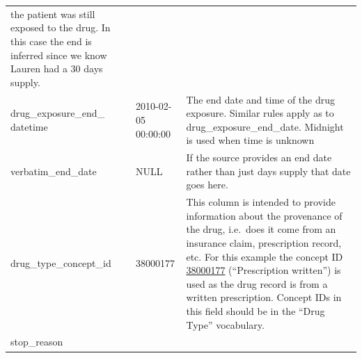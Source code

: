 \documentclass[11pt]{book}
\begin{document}
\begin{longtable}[]{@{}lll@{}}
\begin{minipage}[t]{0.48\columnwidth}
the patient was still exposed to the drug. In this case the end is
inferred since we know Lauren had a 30 days supply.\strut
\end{minipage}\tabularnewline
\begin{minipage}[t]{0.28\columnwidth}\raggedright\strut
drug\_exposure\_end\_ datetime\strut
\end{minipage} & \begin{minipage}[t]{0.16\columnwidth}\raggedright\strut
2010-02-05 00:00:00\strut
\end{minipage} & \begin{minipage}[t]{0.48\columnwidth}\raggedright\strut
The end date and time of the drug exposure. Similar rules apply as to
drug\_exposure\_end\_date. Midnight is used when time is unknown\strut
\end{minipage}\tabularnewline
\begin{minipage}[t]{0.28\columnwidth}\raggedright\strut
verbatim\_end\_date\strut
\end{minipage} & \begin{minipage}[t]{0.16\columnwidth}\raggedright\strut
NULL\strut
\end{minipage} & \begin{minipage}[t]{0.48\columnwidth}\raggedright\strut
If the source provides an end date rather than just days supply that
date goes here.\strut
\end{minipage}\tabularnewline
\begin{minipage}[t]{0.28\columnwidth}\raggedright\strut
drug\_type\_concept\_id\strut
\end{minipage} & \begin{minipage}[t]{0.16\columnwidth}\raggedright\strut
38000177\strut
\end{minipage} & \begin{minipage}[t]{0.48\columnwidth}\raggedright\strut
This column is intended to provide information about the provenance of
the drug, i.e.~does it come from an insurance claim, prescription
record, etc. For this example the concept ID
\href{http://athena.ohdsi.org/search-terms/terms/38000177}{38000177}
(``Prescription written'') is used as the drug record is from a written
prescription. Concept IDs in this field should be in the ``Drug Type''
vocabulary.\strut
\end{minipage}\tabularnewline
\begin{minipage}[t]{0.28\columnwidth}\raggedright\strut
stop\_reason\strut
\end{minipage} & \begin{minipage}[t]{0.16\columnwidth}\raggedright\strut

\end{minipage}
\end{longtable}
\end{document}
